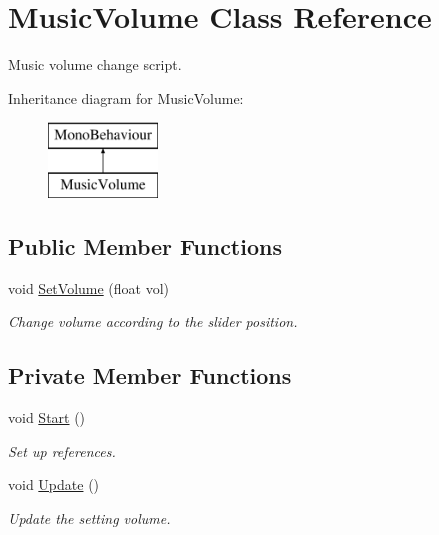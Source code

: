 \hypertarget{class_music_volume}{}\section{Music\+Volume Class Reference}
\label{class_music_volume}


Music volume change script.  


Inheritance diagram for Music\+Volume\+:\begin{figure}[H]
\begin{center}
\leavevmode
\includegraphics[height=2.000000cm]{class_music_volume}
\end{center}
\end{figure}
\subsection*{Public Member Functions}
\begin{DoxyCompactItemize}
\item 
void \mbox{\hyperlink{class_music_volume_a213432416fe8ef6f1e0ed8b6001cd363}{Set\+Volume}} (float vol)
\begin{DoxyCompactList}\small\item\em Change volume according to the slider position. \end{DoxyCompactList}\end{DoxyCompactItemize}
\subsection*{Private Member Functions}
\begin{DoxyCompactItemize}
\item 
void \mbox{\hyperlink{class_music_volume_a6ec38975ea3dcaf028dc63c79fbd6b72}{Start}} ()
\begin{DoxyCompactList}\small\item\em Set up references. \end{DoxyCompactList}\item 
void \mbox{\hyperlink{class_music_volume_a6c614e49e612ee4ab49edf2d45d48a61}{Update}} ()
\begin{DoxyCompactList}\small\item\em Update the setting volume. \end{DoxyCompactList}\end{DoxyCompactItemize}
